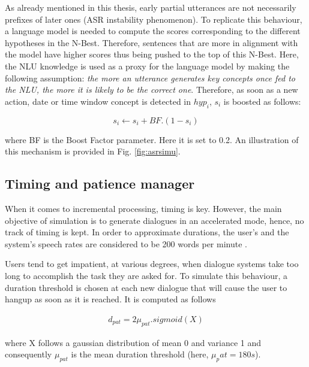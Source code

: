         As already mentioned in this thesis, early partial utterances are not necessarily prefixes of later ones (ASR instability phenomenon). To replicate this behaviour, a language model is needed to compute the scores corresponding to the different hypotheses in the N-Best. Therefore, sentences that are more in alignment with the model have higher scores thus being pushed to the top of this N-Best. Here, the NLU knowledge is used as a proxy for the language model by making the following assumption: \textit{the more an utterance generates key concepts once fed to the NLU, the more it is likely to be the correct one}. Therefore, as soon as a new action, date or time window concept is detected in $hyp_i$, $s_i$ is boosted as follows:
        
        	$$ s_i \leftarrow s_i + BF.(1 - s_i) $$
            
      	where BF is the Boost Factor parameter. Here it is set to 0.2. An illustration of this mechanism is provided in Fig. \ref{fig:asrsimu}.
    
    \subsection{Timing and patience manager}
    
    	When it comes to incremental processing, timing is key. However, the main objective of simulation is to generate dialogues in an accelerated mode, hence, no track of timing is kept. In order to approximate durations, the user's and the system's speech rates are considered to be 200 words per minute \cite{Yuan2006}.
        
        Users tend to get impatient, at various degrees, when dialogue systems take too long to accomplish the task they are asked for. To simulate this behaviour, a duration threshold is chosen at each new dialogue that will cause the user to hangup as soon as it is reached. It is computed as follows
        
       	\begin{eqnarray}
        	d_{pat} = 2 \mu_{pat}.sigmoid(X)
        \end{eqnarray}
        
        where X follows a gaussian distribution of mean 0 and variance 1 and consequently $\mu_{pat}$ is the mean duration threshold (here, $\mu_pat = 180 s$).
    
